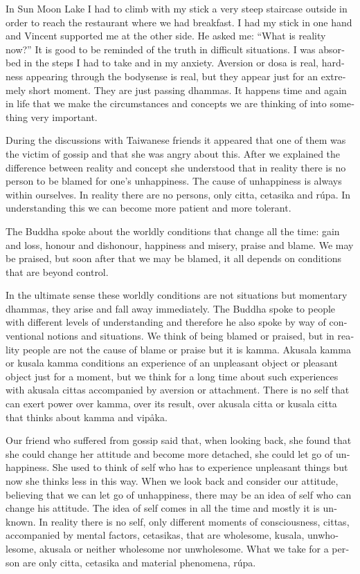 \textdutch{In Sun Moon Lake I had to climb with my stick a very steep
staircase outside in order to reach the restaurant where we had
breakfast. I had my stick in one hand and Vincent supported me at the
other side. He asked me: ``What is reality now?'' It is good to be
reminded of the truth in difficult situations. I was absorbed in the
steps I had to take and in my anxiety. Aversion or dosa is real,
hardness appearing through the bodysense is real, but they appear just
for an extremely short moment. They are just passing dhammas. It happens
time and again in life that we make the circumstances and concepts we
are thinking of into something very important. }

\textdutch{During the discussions with Taiwanese friends it appeared
that one of them was the victim of gossip and that she was angry about
this. After we explained the difference between reality and concept she
understood that in reality there is no person to be blamed for one's
unhappiness. The cause of unhappiness is always within ourselves. In
reality there are no persons, only citta, cetasika and rúpa. In
understanding this we can become more patient and more tolerant. }

\textdutch{The Buddha spoke about the worldly conditions that change all
the time: gain and loss, honour and dishonour, happiness and misery,
praise and blame. We may be praised, but soon after that we may be
blamed, it all depends on conditions that are beyond control. }

\textdutch{In the ultimate sense these worldly conditions are not
situations but momentary dhammas, they arise and fall away immediately.
The Buddha spoke to people with different levels of understanding and
therefore he also spoke by way of conventional notions and situations.
We think of being blamed or praised, but in reality people are not the
cause of blame or praise but it is kamma. Akusala kamma or kusala kamma
conditions an experience of an unpleasant object or pleasant object just
for a moment, but we think for a long time about such experiences with
akusala cittas accompanied by aversion or attachment. There is no self
that can exert power over kamma, over its result, over akusala citta or
kusala citta that thinks about kamma and vipåka.}

\textdutch{Our friend who suffered from gossip said that, when looking
back, she found that she could change her attitude and become more
detached, she could let go of unhappiness. She used to think of self who
has to experience unpleasant things but now she thinks less in this way.
When we look back and consider our attitude, believing that we can let
go of unhappiness, there may be an idea of self who can change his
attitude. The idea of self comes in all the time and mostly it is
unknown. In reality there is no self, only different moments of
consciousness, cittas, accompanied by mental factors, cetasikas, that
are wholesome, kusala, unwholesome, akusala or neither wholesome nor
unwholesome. What we take for a person are only citta, cetasika and
material phenomena, rúpa. }


